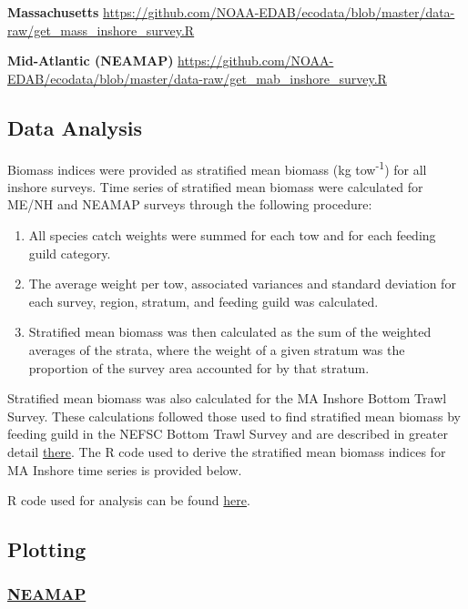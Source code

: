 \documentclass[
]{book}
\providecommand{\tightlist}{%
  \setlength{\itemsep}{0pt}\setlength{\parskip}{0pt}}
\begin{document}
\textbf{Massachusetts}
\url{https://github.com/NOAA-EDAB/ecodata/blob/master/data-raw/get_mass_inshore_survey.R}

\textbf{Mid-Atlantic (NEAMAP)}
\url{https://github.com/NOAA-EDAB/ecodata/blob/master/data-raw/get_mab_inshore_survey.R}

\hypertarget{data-analysis-18}{%
\subsection{Data Analysis}\label{data-analysis-18}}

Biomass indices were provided as stratified mean biomass (kg tow\textsuperscript{-1}) for all inshore surveys. Time series of stratified mean biomass were calculated for ME/NH and NEAMAP surveys through the following procedure:

\begin{enumerate}
\def\labelenumi{\arabic{enumi}.}
\tightlist
\item
  All species catch weights were summed for each tow and for each feeding guild category.
\item
  The average weight per tow, associated variances and standard deviation for each survey, region, stratum, and feeding guild was calculated.
\item
  Stratified mean biomass was then calculated as the sum of the weighted averages of the strata, where the weight of a given stratum was the proportion of the survey area accounted for by that stratum.
\end{enumerate}

Stratified mean biomass was also calculated for the MA Inshore Bottom Trawl Survey. These calculations followed those used to find stratified mean biomass by feeding guild in the NEFSC Bottom Trawl Survey and are described in greater detail \protect\hyperlink{survdat}{there}. The R code used to derive the stratified mean biomass indices for MA Inshore time series is provided below.

R code used for analysis can be found \href{https://github.com/NOAA-EDAB/tech-doc/blob/master/R/stored_scripts/inshore_survey_analysis.R}{here}.

\hypertarget{plotting-13}{%
\subsection{Plotting}\label{plotting-13}}

\hypertarget{neamap}{%
\subsubsection{\texorpdfstring{\href{https://github.com/NOAA-EDAB/ecodata/blob/master/chunk-scripts/macrofauna.Rmd-agg-bio.R}{NEAMAP}}{NEAMAP}}\label{neamap}}
\end{document}
